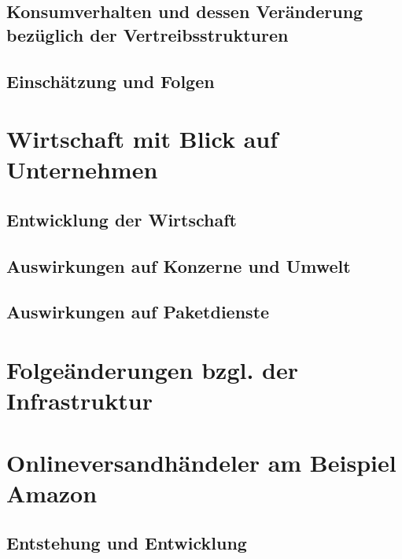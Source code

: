 \documentclass[a4paper, 12pt]{scrartcl}
\begin{document}
        \subsection{Konsumverhalten und dessen Veränderung bezüglich der Vertreibsstrukturen}
            
            
        \subsection{Einschätzung und Folgen}
            
        \newpage
            
            
            
    \section{Wirtschaft mit Blick auf Unternehmen}
        \subsection{Entwicklung der Wirtschaft}
        \subsection{Auswirkungen auf Konzerne und Umwelt}
        \subsection{Auswirkungen auf Paketdienste}
        \newpage
        
    \section{Folgeänderungen bzgl. der Infrastruktur}
            
        \newpage
        
        
        
    \section{Onlineversandhändeler am Beispiel Amazon} 
        
        \subsection{Entstehung und Entwicklung}
            
            
\end{document}
